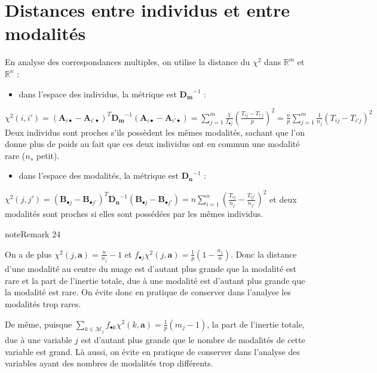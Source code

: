 \documentclass[letterpaper,10pt,french]{sphinxmanual}
\begin{document}
\section{Distances entre individus et entre modalités}
\label{\detokenize{acm:distances-entre-individus-et-entre-modalites}}
\sphinxAtStartPar
En analyse des correspondances multiples, on utilise la distance du \(\chi^2\) dans \(\mathbb{R}^m\) et \(\mathbb{R}^n\) :
\begin{itemize}
\item {} 
\sphinxAtStartPar
dans l’espace des individus, la métrique est \(\mathbf {D_m}^{-1}\) :

\end{itemize}

\sphinxAtStartPar
\(\chi^2(i,i') = (\mathbf{A}_{i\bullet}-\mathbf{A}_{i'\bullet})^T\mathbf {D_m}^{-1} (\mathbf{A}_{i\bullet}-\mathbf{A}_{i'\bullet}) = \displaystyle\sum_{j=1}^m\frac{1}{f_{\bullet j}}\left (\frac{T_{ij}-T_{i'j}}{p} \right )^2 = \frac {n}{p}\displaystyle\sum_{j=1}^m\frac{1}{{n_j}}\left (T_{ij}-T_{i'j}\right )^2\)
Deux individus sont proches s’ils possèdent les mêmes modalités, sachant que l’on donne plus de poids au fait que ces deux individus ont en commun une modalité rare (\(n_s\) petit).
\begin{itemize}
\item {} 
\sphinxAtStartPar
dans l’espace des modalités, la métrique est \(\mathbf {D_n}^{-1}\) :

\end{itemize}

\sphinxAtStartPar
\(\chi^2(j,j') = (\mathbf{B}_{\bullet j}-\mathbf{B}_{\bullet j'})^T\mathbf {D_n}^{-1} (\mathbf{B}_{\bullet j}-\mathbf{B}_{\bullet j'}) = n\displaystyle\sum_{i=1}^n\left (\frac{T_{ij}}{n_j} -\frac{T_{ij'}}{n_{j'}}\right )^2\)
et deux modalités sont proches si elles sont possédées par les mêmes individus.
\label{acm:remark-1}
\begin{sphinxadmonition}{note}{Remark 24}



\sphinxAtStartPar
On a de plus  \(\chi^2(j,\mathbf{a}) = \frac{n}{n_j}-1\) et  \(f_{\bullet j}\chi^2(j,\mathbf{a}) = \frac{1}{p}\left( 1-\frac{n_j}{n}\right )\). Donc la distance d’une modalité au centre du nuage est d’autant plus grande que la modalité est rare et la part de l’inertie totale, due à une modalité est d’autant plus grande que la modalité est rare.  On  évite donc en pratique de conserver dans l’analyse les modalités trop rares.

\sphinxAtStartPar
De même, puisque \(\displaystyle\sum_{k\in \mathcal{M}_j}f_{\bullet k}\chi^2(k,\mathbf{a}) = \frac{1}{p}\left( m_j-1\right )\), la part de l’inertie totale, due à une variable  \(j\) est d’autant plus grande que le nombre de modalités  de cette variable est grand. Là aussi, on  évite en pratique de conserver dans l’analyse des variables ayant des nombres de modalités trop différents.
\end{sphinxadmonition}
\end{document}
